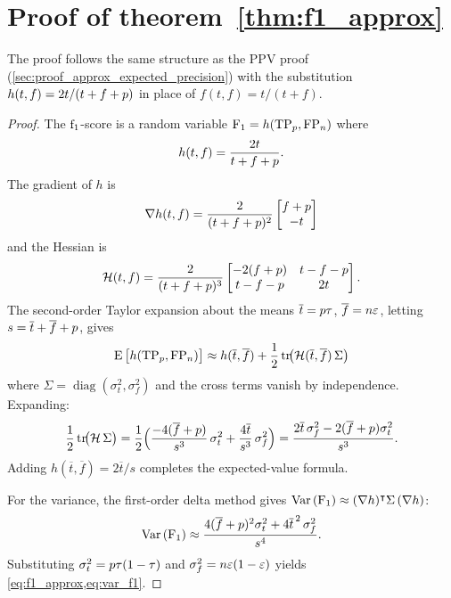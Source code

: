 \section{Proof of theorem~\ref{thm:f1_approx}}
\label{sec:proof_f1}
The proof follows the same structure as the PPV proof (\cref{sec:proof_approx_expected_precision}) with the substitution $h(t,f) = 2t/(t + f + p)$ in place of $f(t,f) = t/(t+f)$.
\begin{proof}
The $\mathrm{f}_1$-score is a random variable $\mathrm{F_1} = h(\mathrm{TP}_p, \mathrm{FP}_n)$ where
\begin{equation}
    h(t, f) = \frac{2t}{t + f + p}.
\end{equation}
The gradient of $h$ is
\begin{equation}
    \nabla h(t,f) =
    \frac{2}{(t + f + p)^2}
    \begin{bmatrix}
        f + p\\
        -t\\
    \end{bmatrix}
\end{equation}
and the Hessian is
\begin{equation}
    \mathcal{H}(t,f) =
    \frac{2}{(t + f + p)^3}
    \begin{bmatrix}
        -2(f+p) & t - f - p\\
        t - f - p & 2 t \\
    \end{bmatrix}.
\end{equation}
The second-order Taylor expansion about the means $\overline{t} = p\tau$, $\overline{f} = n\varepsilon$, letting $s = \overline{t} + \overline{f} + p$, gives
\begin{equation}
    \Expect{h(\TP_\p, \FP_\n)} \approx h(\overline{t}, \overline{f}) + \frac{1}{2}\operatorname{tr}\!\bigl(\mathcal{H}(\overline{t},\overline{f})\,\Sigma\bigr)
\end{equation}
where $\Sigma = \operatorname{diag}(\sigma_t^2, \sigma_f^2)$ and the cross terms vanish by independence.
Expanding:
\begin{equation}
    \frac{1}{2}\operatorname{tr}\!\bigl(\mathcal{H}\,\Sigma\bigr) =
    \frac{1}{2}\Bigl(\frac{-4(\overline{f}+p)}{s^3}\,\sigma_t^2 +
    \frac{4\overline{t}}{s^3}\,\sigma_f^2\Bigr) =
    \frac{2\overline{t}\,\sigma_f^2 - 2(\overline{f}+p)\sigma_t^2}{s^3}.
\end{equation}
Adding $h(\overline{t},\overline{f}) = 2\overline{t}/s$ completes the expected-value formula.

For the variance, the first-order delta method gives $\Var{\Fone} \approx (\nabla h)^\intercal \Sigma\,(\nabla h)$:
\begin{equation}
    \Var{\Fone} \approx \frac{4(\overline{f}+\p)^2 \sigma_t^2 + 4\overline{t}^{\,2}\,\sigma_f^2}{s^4}.
\end{equation}
Substituting $\sigma_t^2 = p\tau(1-\tau)$ and $\sigma_f^2 = n\varepsilon(1-\varepsilon)$ yields \cref{eq:f1_approx,eq:var_f1}.
\end{proof}

